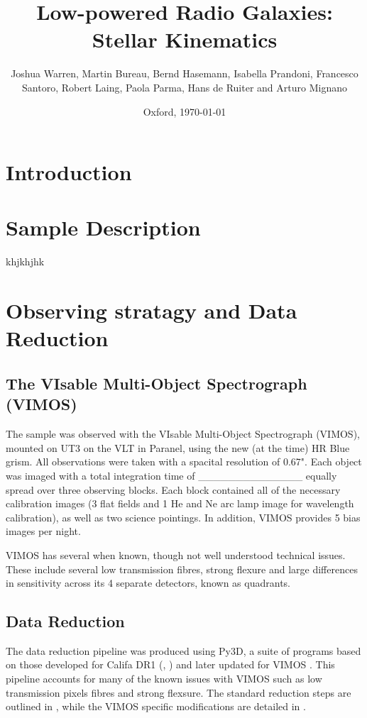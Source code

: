 \documentclass[a4paper,11pt]{article}
\begin{document}
\title{Low-powered Radio Galaxies: Stellar Kinematics}
\author{Joshua Warren, Martin Bureau, Bernd Hasemann, Isabella Prandoni, Francesco Santoro, Robert Laing, Paola Parma, Hans de Ruiter and Arturo Mignano}
\date{Oxford, \today}


\maketitle


\section{Introduction}
	\label{sec:intro}

\section{Sample Description}
	\label{sec:samp}
	khjkhjhk

\section{Observing stratagy and Data Reduction}
	\label{sec:obs}
	\subsection{The VIsable Multi-Object Spectrograph (VIMOS)}
		\label{subsec:VIMOS}
		The sample was observed with the VIsable Multi-Object Spectrograph (VIMOS), mounted on UT3 on the VLT in Paranel, using the new (at the time) HR Blue grism. All observations were taken with a spacital resolution of 0.67". Each object was imaged with a total integration time of \_\_\_\_\_\_\_\_\_\_\_\_\_\_ equally spread over three observing blocks. Each block contained all of the necessary calibration images (3 flat fields and 1 He and Ne arc lamp image for wavelength calibration), as well as two science pointings. In addition, VIMOS provides 5 bias images per night. 

		VIMOS has several when known, though not well understood technical issues. These include several low transmission fibres, strong flexure and large differences in sensitivity across its 4 separate detectors, known as quadrants.

	\subsection{Data Reduction}
		\label{subsec:reduct}
		The data reduction pipeline was produced using Py3D, a suite of programs based on those developed for Califa DR1 (\cite{Sanchez2011}, \cite{Husemann2013}) and later updated for VIMOS \cite{Husemann2014}. This pipeline accounts for many of the known issues with VIMOS such as low transmission pixels fibres and strong flexsure. The standard reduction steps are outlined in \cite{Sanchez2011}, while the VIMOS specific modifications are detailed in \cite{Husemann2014}. 
\end{document}
